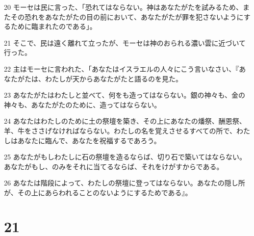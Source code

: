 \par 20 モーセは民に言った、「恐れてはならない。神はあなたがたを試みるため、またその恐れをあなたがたの目の前において、あなたがたが罪を犯さないようにするために臨まれたのである」。
\par 21 そこで、民は遠く離れて立ったが、モーセは神のおられる濃い雲に近づいて行った。
\par 22 主はモーセに言われた、「あなたはイスラエルの人々にこう言いなさい、『あなたがたは、わたしが天からあなたがたと語るのを見た。
\par 23 あなたがたはわたしと並べて、何をも造ってはならない。銀の神々も、金の神々も、あなたがたのために、造ってはならない。
\par 24 あなたはわたしのために土の祭壇を築き、その上にあなたの燔祭、酬恩祭、羊、牛をささげなければならない。わたしの名を覚えさせるすべての所で、わたしはあなたに臨んで、あなたを祝福するであろう。
\par 25 あなたがもしわたしに石の祭壇を造るならば、切り石で築いてはならない。あなたがもし、のみをそれに当てるならば、それをけがすからである。
\par 26 あなたは階段によって、わたしの祭壇に登ってはならない。あなたの隠し所が、その上にあらわれることのないようにするためである』。

\chapter{21}

